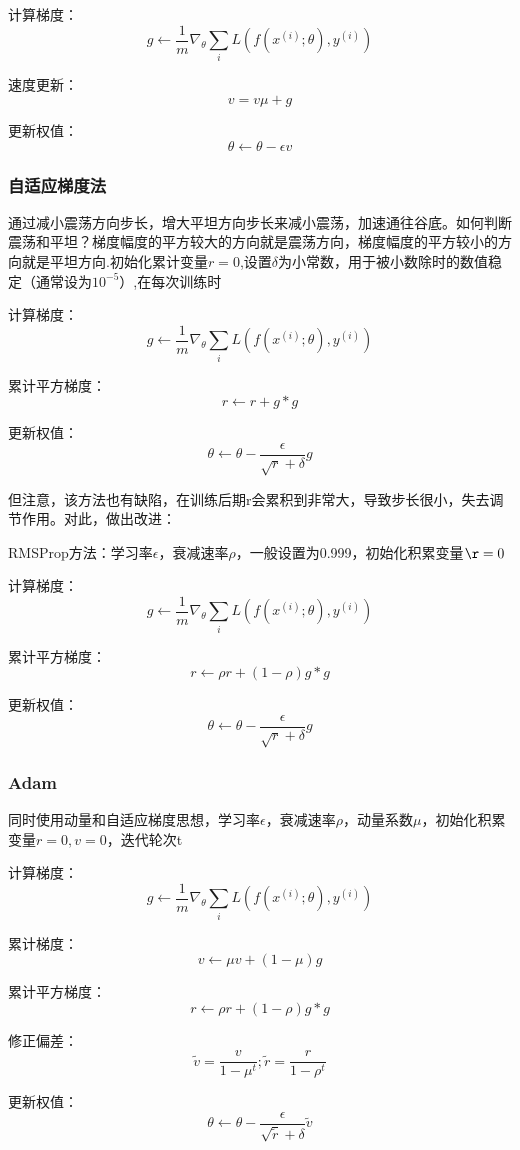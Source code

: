 \documentclass[12pt]{article}
\begin{document}
计算梯度：
$$g\leftarrow \frac{1}{m}\nabla_\theta\sum_{i}L(f(x^{(i)};\theta),y^{(i)}) $$

速度更新：
$$v=v\mu+g$$

更新权值：
$$\theta\leftarrow\theta-\epsilon v$$

\subsubsection{自适应梯度法}
通过减小震荡方向步长，增大平坦方向步长来减小震荡，加速通往谷底。如何判断震荡和平坦？梯度幅度的平方较大的方向就是震荡方向，梯度幅度的平方较小的方向就是平坦方向.初始化累计变量$r=0$,设置$\delta$为小常数，用于被小数除时的数值稳定（通常设为$10^{-5}$）,在每次训练时

计算梯度：
$$g\leftarrow \frac{1}{m}\nabla_\theta\sum_{i}L(f(x^{(i)};\theta),y^{(i)}) $$

累计平方梯度：
$$r\leftarrow r+g*g$$

更新权值：
$$\theta \leftarrow \theta -\frac{\epsilon}{\sqrt{r} +\delta}g$$

但注意，该方法也有缺陷，在训练后期r会累积到非常大，导致步长很小，失去调节作用。对此，做出改进：

RMSProp方法：学习率$\epsilon$，衰减速率$\rho$，一般设置为0.999，初始化积累变量$\r=0$

计算梯度：
$$g\leftarrow \frac{1}{m}\nabla_\theta\sum_{i}L(f(x^{(i)};\theta),y^{(i)}) $$

累计平方梯度：
$$r\leftarrow \rho r+(1-\rho)g*g$$

更新权值：
$$\theta \leftarrow \theta -\frac{\epsilon}{\sqrt{r} +\delta}g$$

\subsubsection{Adam}
同时使用动量和自适应梯度思想，学习率$\epsilon$，衰减速率$\rho$，动量系数$\mu$，初始化积累变量$r=0,v=0$，迭代轮次t

计算梯度：
$$g\leftarrow \frac{1}{m}\nabla_\theta\sum_{i}L(f(x^{(i)};\theta),y^{(i)}) $$

累计梯度：
$$v\leftarrow \mu v+(1-\mu)g$$

累计平方梯度：
$$r\leftarrow \rho r+(1-\rho)g*g$$

修正偏差：
$$\widetilde{v}=\frac{v}{1-\mu^t}  ; \widetilde{r}=\frac{r}{1-\rho^t}$$

更新权值：
$$ \theta\leftarrow\theta-\frac{\epsilon}{\sqrt{\widetilde{r}}+\delta}\widetilde{v}$$
\end{document}
